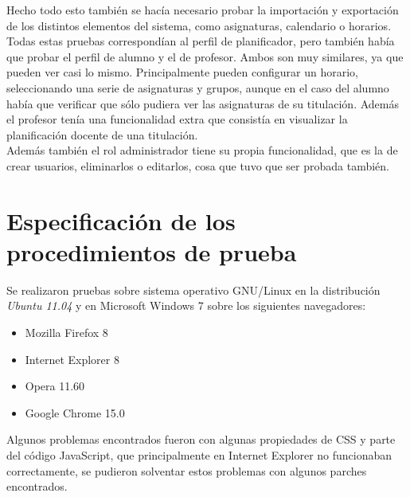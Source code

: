 \begin{itemize}
Hecho todo esto también se hacía necesario probar la importación y exportación de los distintos elementos del sistema, como asignaturas, calendario o horarios.\\

Todas estas pruebas correspondían al perfil de planificador, pero también había que probar el perfil de alumno y el de profesor. Ambos son muy similares, ya que pueden ver casi lo mismo. Principalmente pueden configurar un horario, seleccionando una serie de asignaturas y grupos, aunque en el caso del alumno había que verificar que sólo pudiera ver las asignaturas de su titulación. Además el profesor tenía una funcionalidad extra que consistía en visualizar la planificación docente de una titulación.\\

Además también el rol administrador tiene su propia funcionalidad, que es la de crear usuarios, eliminarlos o editarlos, cosa que tuvo que ser probada también. 
\end{itemize}
\section{Especificación de los procedimientos de prueba}

Se realizaron pruebas sobre sistema operativo GNU/Linux en la distribución {\em Ubuntu 11.04} y en Microsoft Windows 7 sobre los siguientes navegadores:
\begin{itemize}
\item Mozilla Firefox 8
\item Internet Explorer 8
\item Opera 11.60
\item Google Chrome 15.0
\end{itemize}

Algunos problemas encontrados fueron con algunas propiedades de CSS y parte del código JavaScript, que principalmente en Internet Explorer no funcionaban correctamente, se pudieron solventar estos problemas con algunos parches encontrados.

